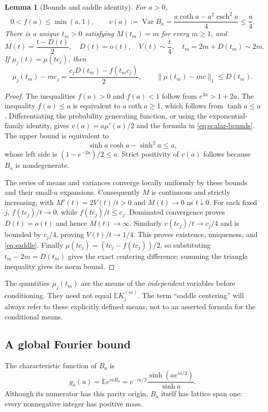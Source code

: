 \documentclass[11pt,a4paper]{article}
\numberwithin{equation}{section}
\newtheorem{lemma}[theorem]{Lemma}
\theoremstyle{definition}
\theoremstyle{remark}
\newcommand{\E}{\mathbb E}
\newcommand{\Var}{\operatorname{Var}}
\newcommand{\csch}{\operatorname{csch}}
\begin{document}
\begin{lemma}[Bounds and saddle identity]
\label{lem:saddle}
For $a>0$,
\begin{equation}
0<f(a)\le\min(a,1),\qquad
v(a):=\Var B_a
=\frac{a\coth a-a^2\csch^2a}{4}
\le\frac a4.
\label{eq:scalar-bounds}
\end{equation}
There is a unique $t_m>0$ satisfying $M(t_m)=m$ for every $m\ge1$, and
\begin{equation}
M(t)=\frac{t-D(t)}2,\quad
D(t)=o(t),\quad V(t)\sim\frac t4,\quad
t_m=2m+D(t_m)\sim2m.
\label{eq:saddle}
\end{equation}
If $\mu_j(t)=\mu(tc_j)$, then
\begin{equation}
\mu_j(t_m)-mc_j=\frac{c_jD(t_m)-f(t_mc_j)}2,
\qquad
\|\mu(t_m)-mc\|_1\le D(t_m).
\label{eq:centering-difference}
\end{equation}
\end{lemma}
\begin{proof}
The inequalities $f(a)>0$ and $f(a)<1$ follow from $e^{2a}>1+2a$.
The inequality $f(a)\le a$ is equivalent to $a\coth a\ge1$, which
follows from $\tanh a\le a$. Differentiating the probability generating
function, or using the exponential-family identity, gives
$v(a)=a\mu'(a)/2$ and the formula in \cref{eq:scalar-bounds}.
The upper bound is equivalent to
\[
\sinh a\cosh a-\sinh^2a\le a,
\]
whose left side is $(1-e^{-2a})/2\le a$. Strict positivity of $v(a)$
follows because $B_a$ is nondegenerate.

The series of means and variances converge locally uniformly by these
bounds and their small-$a$ expansions. Consequently $M$ is continuous and
strictly increasing, with $M'(t)=2V(t)/t>0$ and $M(t)\to0$ as
$t\downarrow0$. For each fixed $j$, $f(tc_j)/t\to0$, while
$f(tc_j)/t\le c_j$. Dominated convergence proves $D(t)=o(t)$ and hence
$M(t)\to\infty$. Similarly $v(tc_j)/t\to c_j/4$ and is bounded by
$c_j/4$, proving $V(t)/t\to1/4$. This proves existence, uniqueness, and
\cref{eq:saddle}. Finally $\mu(tc_j)=(tc_j-f(tc_j))/2$, so substituting
$t_m-2m=D(t_m)$ gives the exact centering difference; summing the triangle
inequality gives its norm bound.
\end{proof}

The quantities $\mu_j(t_m)$ are the means of the \emph{independent}
variables before conditioning. They need not equal $\E K_j^{(m)}$.
The term ``saddle centering'' will always refer to these explicitly defined
means, not to an asserted formula for the conditional means.

\subsection{A global Fourier bound}
The characteristic function of $B_a$ is
\begin{equation}
g_a(u)=\E e^{iuB_a}
=e^{-iu/2}\frac{\sinh(ae^{iu/2})}{\sinh a}.
\label{eq:characteristic}
\end{equation}
Although its numerator has this parity origin, $B_a$ itself has lattice
span one: every nonnegative integer has positive mass.
\end{document}
